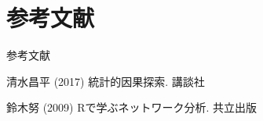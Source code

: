 \documentclass[dvipdfmx]{beamer}
\begin{document}
\section{参考文献}
\begin{frame}{参考文献}

{\scriptsize
\begin{thebibliography}{99}
\beamertemplatetextbibitems

清水昌平 (2017) 統計的因果探索. 講談社

鈴木努 (2009) Rで学ぶネットワーク分析. 共立出版


\end{thebibliography}
}

\end{frame}
\end{document}
